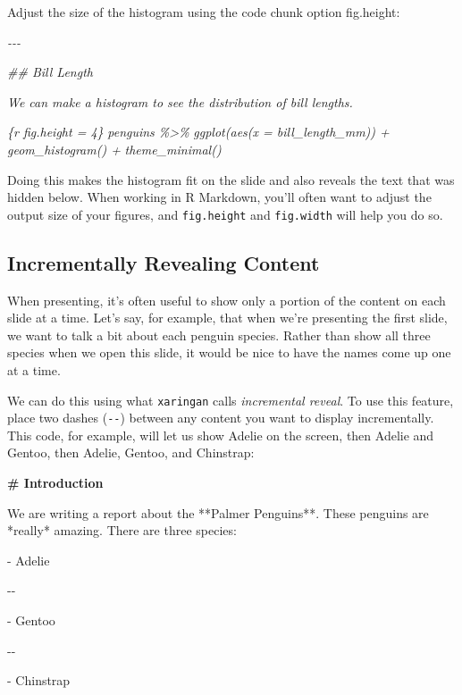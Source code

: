 \documentclass[
]{book}
\newenvironment{Shaded}{\begin{snugshade}}{\end{snugshade}}
\newcommand{\CommentTok}[1]{\textcolor[rgb]{0.56,0.35,0.01}{\textit{#1}}}
\newcommand{\FunctionTok}[1]{\textcolor[rgb]{0.13,0.29,0.53}{\textbf{#1}}}
\newcommand{\NormalTok}[1]{#1}
\newcommand{\SpecialStringTok}[1]{\textcolor[rgb]{0.31,0.60,0.02}{#1}}
\begin{document}
Adjust the size of the histogram using the code chunk option fig.height:

\begin{Shaded}
\begin{Highlighting}[]
\CommentTok{{-}{-}{-}}

\CommentTok{\#\# Bill Length}

\CommentTok{We can make a histogram to see the distribution of bill lengths.}

\CommentTok{\textasciigrave{}\textasciigrave{}\textasciigrave{}\{r fig.height = 4\}}
\CommentTok{penguins \%\textgreater{}\%}
\CommentTok{  ggplot(aes(x = bill\_length\_mm)) +}
\CommentTok{  geom\_histogram() +}
\CommentTok{  theme\_minimal()}
\CommentTok{\textasciigrave{}\textasciigrave{}\textasciigrave{}}
\end{Highlighting}
\end{Shaded}

Doing this makes the histogram fit on the slide and also reveals the text that was hidden below. When working in R Markdown, you'll often want to adjust the output size of your figures, and \texttt{fig.height} and \texttt{fig.width} will help you do so.

\hypertarget{incrementally-revealing-content}{%
\subsection*{Incrementally Revealing Content}\label{incrementally-revealing-content}}

When presenting, it's often useful to show only a portion of the content on each slide at a time. Let's say, for example, that when we're presenting the first slide, we want to talk a bit about each penguin species. Rather than show all three species when we open this slide, it would be nice to have the names come up one at a time.

We can do this using what \texttt{xaringan} calls \emph{incremental reveal}. To use this feature, place two dashes (\texttt{-\/-}) between any content you want to display incrementally. This code, for example, will let us show Adelie on the screen, then Adelie and Gentoo, then Adelie, Gentoo, and Chinstrap:

\begin{Shaded}
\begin{Highlighting}[]
\FunctionTok{\# Introduction}

\NormalTok{We are writing a report about the **Palmer Penguins**. These penguins are *really* amazing. There are three species:}

\SpecialStringTok{{-} }\NormalTok{Adelie}

\NormalTok{{-}{-}}

\SpecialStringTok{{-} }\NormalTok{Gentoo}

\NormalTok{{-}{-}}

\SpecialStringTok{{-} }\NormalTok{Chinstrap}
\end{Highlighting}
\end{Shaded}
\end{document}
